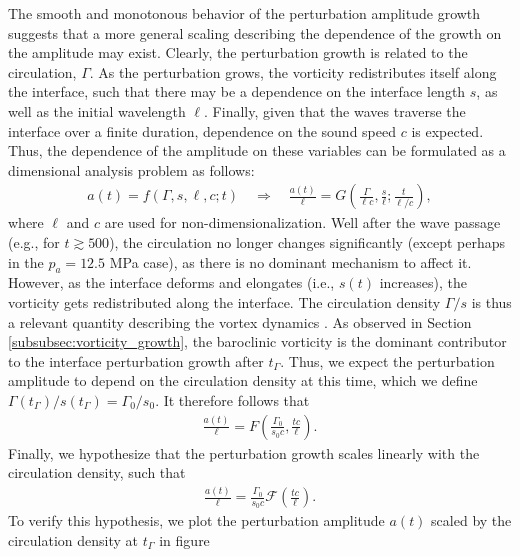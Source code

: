 The smooth and monotonous behavior of the perturbation amplitude
growth suggests that a more general scaling describing the dependence
of the growth on the amplitude may exist.  Clearly, the perturbation
growth is related to the circulation, $\Gamma$. As the perturbation
grows, the vorticity redistributes itself along the interface, such
that there may be a dependence on the interface length $s$, as well as
the initial wavelength $\ell$. Finally, given that the waves traverse
the interface over a finite duration, dependence on the sound speed
$c$ is expected. Thus, the dependence of the amplitude on these
variables can be formulated as a dimensional analysis problem as
follows:
\begin{align}
  \label{eq:dimensional_amplitude}
  a(t)=f(\Gamma, s, \ell, c; t) \quad \Rightarrow \quad
  \frac{a(t)}{\ell} = G\left(\frac{\Gamma}{\ell c}, \frac{s}{\ell};
  \frac{t}{\ell/c}\right),
\end{align}
where $\ell$ and $c$ are used for non-dimensionalization.  Well after
the wave passage (e.g., for $t\gtrsim 500$), the circulation no longer
changes significantly (except perhaps in the $p_a = 12.5$ MPa case),
as there is no dominant mechanism to affect it. However, as the
interface deforms and elongates (i.e., $s(t)$ increases), the
vorticity gets redistributed along the interface.  The circulation
density $\Gamma / s$ is thus a relevant quantity describing the vortex
dynamics \cite[]{Pozrikidis2000}. As observed in Section
\ref{subsubsec:vorticity_growth}, the baroclinic vorticity is the
dominant contributor to the interface perturbation growth after
$t_\Gamma$. Thus, we expect the perturbation amplitude to depend on
the circulation density at this time, which we define
$\Gamma(t_\Gamma)/s(t_\Gamma) = \Gamma_0 / s_0$. It therefore follows
that
% 
\begin{align}
  \label{eq:dimensionless_groups}
  \frac{a(t)}{\ell}=F\left(\frac{\Gamma_0}{s_0 c}, \frac{t c}{\ell} \right).
\end{align}
% 
Finally, we hypothesize that the perturbation growth scales linearly
with the circulation density, such that
% 
\begin{align}
  \label{eq:dimensionless_relationship}
  \frac{a(t)}{\ell}=\frac{\Gamma_0}{s_0 c}\mathcal{F}\left(\frac{t c}{\ell} \right).
\end{align}
% 
To verify this hypothesis, we plot the perturbation amplitude $a(t)$
scaled by the circulation density at $t_\Gamma$ in figure
